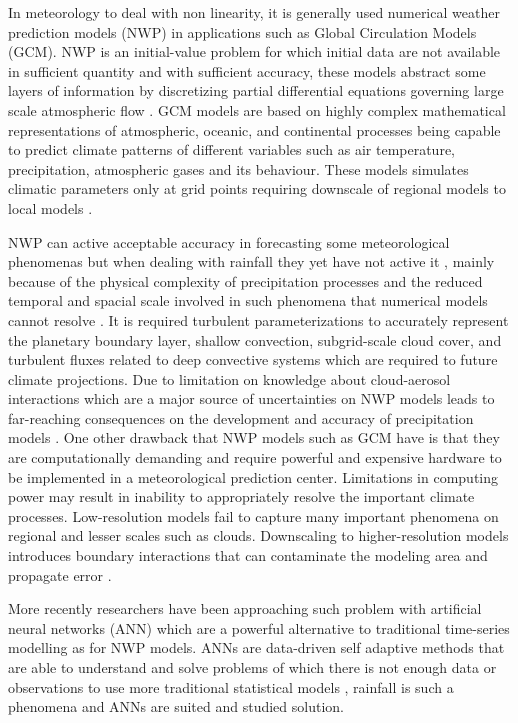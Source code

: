 In meteorology to deal with non linearity, it is generally used numerical weather prediction models (NWP) in applications such as Global Circulation Models (GCM). NWP is an initial-value problem for which initial data are not available in sufficient quantity and with sufficient accuracy, these models abstract some layers of information by discretizing partial differential equations governing large scale atmospheric flow \cite{ghil1981applications}. GCM models are based on highly complex mathematical representations of atmospheric, oceanic, and continental processes being capable to predict climate patterns of different variables such as air temperature, precipitation, atmospheric gases and its behaviour. These models simulates climatic parameters only at grid points requiring downscale of regional models to local models \cite{alotaibi2018future}. 

NWP can active acceptable accuracy in forecasting some meteorological phenomenas but when dealing with rainfall they yet have not active it \cite{ramirez2006linear}, mainly because of the physical complexity of precipitation processes and the reduced temporal and spacial scale involved in such phenomena that numerical models cannot resolve \cite{kuligowski1998localized}. It is required turbulent parameterizations to accurately represent the planetary boundary layer, shallow convection, subgrid-scale cloud cover, and turbulent fluxes related to deep convective systems which are required to future climate projections. Due to limitation on knowledge about cloud-aerosol interactions which are a major source of uncertainties on NWP models leads to far-reaching consequences on the development and accuracy of precipitation models \cite{prein2015review}. One other drawback that NWP models such as GCM have is that they are computationally demanding and require powerful and expensive hardware to be implemented in a meteorological prediction center.  Limitations in computing power may result in inability to appropriately resolve the important climate processes. Low-resolution models fail to capture many important phenomena on regional and lesser scales such as clouds. Downscaling to higher-resolution models introduces boundary interactions that can contaminate the modeling area and propagate error \cite{alotaibi2018future}.

More recently researchers have been approaching such problem with artificial neural networks (ANN) which are a powerful alternative to traditional time-series modelling \cite{zhang1998linear} as for NWP models. ANNs are data-driven self adaptive methods that are able to understand and solve problems of which there is not enough data or observations to use more traditional statistical models \cite{zhang1998forecasting}, rainfall is such a phenomena and ANNs are suited and studied solution.

